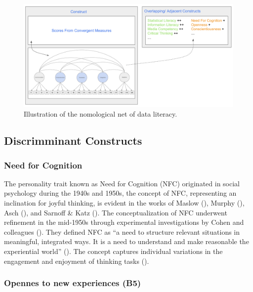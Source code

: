 \documentclass[
  12pt,
  a4paper,
  twoside]{article}
\begin{document}
\begin{figure}

{\centering \includegraphics[width=1\linewidth]{images/DL_Nomological_Net} 

}

\caption{Illustration of the nomological net of data literacy.  }\label{fig:workflow}
\end{figure}

\subsection{Discrimminant Constructs}\label{discrimminant-constructs}

\subsubsection{Need for Cognition}\label{need-for-cognition}

The personality trait known as Need for Cognition (NFC) originated in
social psychology during the 1940s and 1950s, the concept of NFC,
representing an inclination for joyful thinking, is evident in the works
of Maslow (), Murphy
(), Asch (),
and Sarnoff \& Katz (). The
conceptualization of NFC underwent refinement in the mid-1950s through
experimental investigations by Cohen and colleagues
(). They defined NFC as ``a
need to structure relevant situations in meaningful, integrated ways. It
is a need to understand and make reasonable the experiential world''
(). The concept
captures individual variations in the engagement and enjoyment of
thinking tasks ().

\subsubsection{Opennes to new experiences
(B5)}\label{opennes-to-new-experiences-b5}
\end{document}
